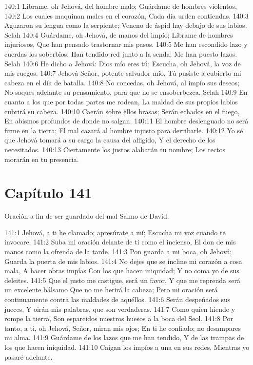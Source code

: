 140:1 Líbrame, oh Jehová, del hombre malo; 
Guárdame de hombres violentos, 
140:2 Los cuales maquinan males en el corazón, 
Cada día urden contiendas. 
140:3 Aguzaron su lengua como la serpiente; 
Veneno de áspid hay debajo de sus labios. Selah 
140:4 Guárdame, oh Jehová, de manos del impío; 
Líbrame de hombres injuriosos, 
Que han pensado trastornar mis pasos. 
140:5 Me han escondido lazo y cuerdas los soberbios; 
Han tendido red junto a la senda; 
Me han puesto lazos. Selah 
140:6 He dicho a Jehová: Dios mío eres tú; 
Escucha, oh Jehová, la voz de mis ruegos. 
140:7 Jehová Señor, potente salvador mío, 
Tú pusiste a cubierto mi cabeza en el día de batalla. 
140:8 No concedas, oh Jehová, al impío sus deseos; 
No saques adelante su pensamiento, para que no se ensoberbezca. Selah 
140:9 En cuanto a los que por todas partes me rodean, 
La maldad de sus propios labios cubrirá su cabeza. 
140:10 Caerán sobre ellos brasas; 
Serán echados en el fuego, 
En abismos profundos de donde no salgan. 
140:11 El hombre deslenguado no será firme en la tierra; 
El mal cazará al hombre injusto para derribarle. 
140:12 Yo sé que Jehová tomará a su cargo la causa del afligido, 
Y el derecho de los necesitados. 
140:13 Ciertamente los justos alabarán tu nombre; 
Los rectos morarán en tu presencia. 
\section*{Capítulo 141}
Oración a fin de ser guardado del mal 
Salmo de David. 
 
141:1 Jehová, a ti he clamado; apresúrate a mí; 
Escucha mi voz cuando te invocare. 
141:2 Suba mi oración delante de ti como el incienso, 
El don de mis manos como la ofrenda de la tarde. 
141:3 Pon guarda a mi boca, oh Jehová; 
Guarda la puerta de mis labios. 
141:4 No dejes que se incline mi corazón a cosa mala, 
A hacer obras impías 
Con los que hacen iniquidad; 
Y no coma yo de sus deleites. 
141:5 Que el justo me castigue, será un favor, 
Y que me reprenda será un excelente bálsamo 
Que no me herirá la cabeza; 
Pero mi oración será continuamente contra las maldades de aquéllos. 
141:6 Serán despeñados sus jueces, 
Y oirán mis palabras, que son verdaderas. 
141:7 Como quien hiende y rompe la tierra, 
Son esparcidos nuestros huesos a la boca del Seol. 
141:8 Por tanto, a ti, oh Jehová, Señor, miran mis ojos; 
En ti he confiado; no desampares mi alma. 
141:9 Guárdame de los lazos que me han tendido, 
Y de las trampas de los que hacen iniquidad. 
141:10 Caigan los impíos a una en sus redes, 
Mientras yo pasaré adelante. 
